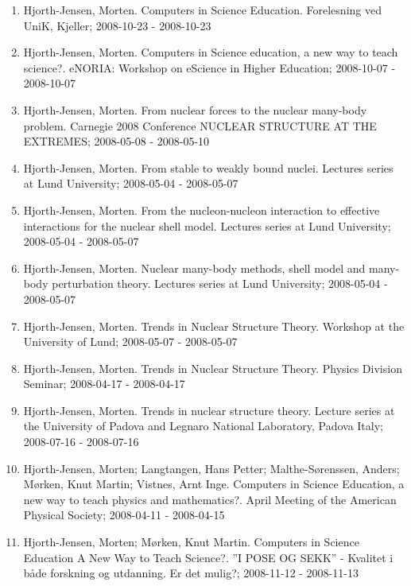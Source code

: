 \documentclass[%
oneside,                 %
final,                   %
10pt]{article}
\begin{document}
\begin{enumerate}
\item Hjorth-Jensen, Morten.  Computers in Science Education. Forelesning ved UniK, Kjeller; 2008-10-23 - 2008-10-23

\item Hjorth-Jensen, Morten.  Computers in Science education, a new way to teach science?. eNORIA: Workshop on eScience in Higher Education; 2008-10-07 - 2008-10-07

\item Hjorth-Jensen, Morten.  From nuclear forces to the nuclear many-body problem. Carnegie 2008 Conference NUCLEAR STRUCTURE AT THE EXTREMES; 2008-05-08 - 2008-05-10

\item Hjorth-Jensen, Morten.  From stable to weakly bound nuclei. Lectures series at Lund University; 2008-05-04 - 2008-05-07

\item Hjorth-Jensen, Morten.  From the nucleon-nucleon interaction to effective interactions for the nuclear shell model. Lectures series at Lund University; 2008-05-04 - 2008-05-07

\item Hjorth-Jensen, Morten.  Nuclear many-body methods, shell model and many-body perturbation theory. Lectures series at Lund University; 2008-05-04 - 2008-05-07

\item Hjorth-Jensen, Morten.  Trends in Nuclear Structure Theory. Workshop at the University of Lund; 2008-05-07 - 2008-05-07

\item Hjorth-Jensen, Morten.  Trends in Nuclear Structure Theory. Physics Division Seminar; 2008-04-17 - 2008-04-17

\item Hjorth-Jensen, Morten.  Trends in nuclear structure theory. Lecture series at the University of Padova and Legnaro National Laboratory, Padova Italy; 2008-07-16 - 2008-07-16

\item Hjorth-Jensen, Morten; Langtangen, Hans Petter; Malthe-Sørenssen, Anders; Mørken, Knut Martin; Vistnes, Arnt Inge.  Computers in Science Education, a new way to teach physics and mathematics?. April Meeting of the American Physical Society; 2008-04-11 - 2008-04-15

\item Hjorth-Jensen, Morten; Mørken, Knut Martin.  Computers in Science Education A New Way to Teach Science?. ”I POSE OG SEKK” - Kvalitet i både forskning og utdanning. Er det mulig?; 2008-11-12 - 2008-11-13


\end{enumerate}
\end{document}
